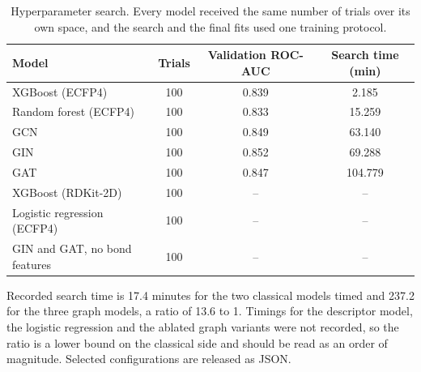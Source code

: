 \begin{table}[htbp]
\centering
\caption{Hyperparameter search. Every model received the same number of trials over its own space, and the search and the final fits used one training protocol.}
\label{tab:si_hpo}
\small
\setlength{\tabcolsep}{4pt}
\begin{tabular}{lccc}
\toprule
Model & Trials & Validation ROC-AUC & Search time (min) \\
\midrule
XGBoost (ECFP4) & 100 & 0.839 & 2.185 \\
Random forest (ECFP4) & 100 & 0.833 & 15.259 \\
GCN & 100 & 0.849 & 63.140 \\
GIN & 100 & 0.852 & 69.288 \\
GAT & 100 & 0.847 & 104.779 \\
XGBoost (RDKit-2D) & 100 & -- & -- \\
Logistic regression (ECFP4) & 100 & -- & -- \\
GIN and GAT, no bond features & 100 & -- & -- \\
\bottomrule
\end{tabular}
\begin{flushleft}\footnotesize Recorded search time is 17.4 minutes for the two classical models timed and 237.2 for the three graph models, a ratio of 13.6 to 1. Timings for the descriptor model, the logistic regression and the ablated graph variants were not recorded, so the ratio is a lower bound on the classical side and should be read as an order of magnitude. Selected configurations are released as JSON.\end{flushleft}
\end{table}

